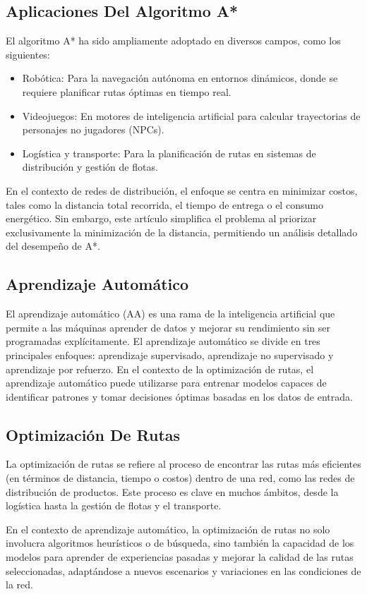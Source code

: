 \documentclass[conference]{IEEEtran}
\begin{document}
	\subsection{Aplicaciones Del Algoritmo A*}
	El algoritmo A* ha sido ampliamente adoptado en diversos campos, como los siguientes:
	\begin{itemize}
		\item Robótica: Para la navegación autónoma en entornos dinámicos, donde se requiere planificar rutas óptimas en tiempo real.
		\item Videojuegos: En motores de inteligencia artificial para calcular trayectorias de personajes no jugadores (NPCs).
		\item Logística y transporte: Para la planificación de rutas en sistemas de distribución y gestión de flotas.
	\end{itemize}
	En el contexto de redes de distribución, el enfoque se centra en minimizar costos, tales como la distancia total recorrida, el tiempo de entrega o el consumo energético. Sin embargo, este artículo simplifica el problema al priorizar exclusivamente la minimización de la distancia, permitiendo un análisis detallado del desempeño de A*.
	\subsection{Aprendizaje Automático}
	El aprendizaje automático (AA) es una rama de la inteligencia artificial que permite a las máquinas aprender de datos y mejorar su rendimiento sin ser programadas explícitamente. El aprendizaje automático se divide en tres principales enfoques: aprendizaje supervisado, aprendizaje no supervisado y aprendizaje por refuerzo. En el contexto de la optimización de rutas, el aprendizaje automático puede utilizarse para entrenar modelos capaces de identificar patrones y tomar decisiones óptimas basadas en los datos de entrada.
	\subsection{Optimización De Rutas}
	La optimización de rutas se refiere al proceso de encontrar las rutas más eficientes (en términos de distancia, tiempo o costos) dentro de una red, como las redes de distribución de productos. Este proceso es clave en muchos ámbitos, desde la logística hasta la gestión de flotas y el transporte.
	
	En el contexto de aprendizaje automático, la optimización de rutas no solo involucra algoritmos heurísticos o de búsqueda, sino también la capacidad de los modelos para aprender de experiencias pasadas y mejorar la calidad de las rutas seleccionadas, adaptándose a nuevos escenarios y variaciones en las condiciones de la red.
\end{document}
